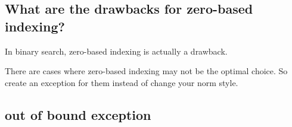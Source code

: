 \subsection{What are the drawbacks for zero-based indexing?}

In binary search, zero-based indexing is actually a drawback.

There are cases where zero-based indexing may not be the optimal choice.
So create an exception for them instead of change your norm style.

\subsection{out of bound exception}
